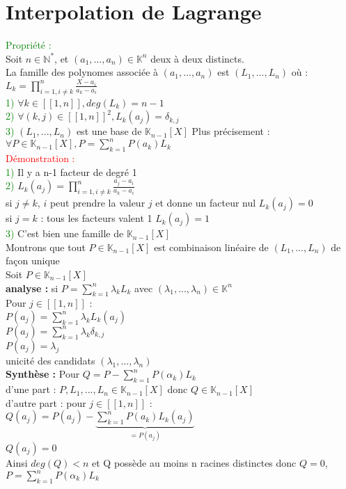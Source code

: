 \documentclass{article}
\begin{document}
\section{Interpolation de Lagrange}
\textcolor{green}{Propriété :} \\
Soit $n \in \mathbb N^*$, et $(a_1,...,a_n) \in \mathbb K^n$ deux à deux distincts. \\
La famille des polynomes associée à $(a_1,...,a_n)$ est $(L_1,...,L_n)$ où : \\
$L_k=\prod_{i=1,i \neq k}^n \frac{X-a_i}{a_k-a_i}$ \\
\textcolor{green}{1)} $\forall k \in [[1,n]], deg(L_k)=n-1$ \\
\textcolor{green}{2)} $\forall (k,j) \in [[1,n]]^2, L_k(a_j)=\delta_{k,j}$ \\
\textcolor{green}{3)} $(L_1,...,L_n)$ est une base de $\mathbb K_{n-1} [X] $ Plus précisement : \\
$\forall P \in \mathbb K_{n-1} [X], P= \sum_{k=1}^n P(a_k) L_k$ \\
\textcolor{red}{Démonstration :} \\
\textcolor{green}{1)} Il y a n-1 facteur de degré 1 \\
\textcolor{green}{2)} $L_k(a_j)=\prod_{i=1,i \neq k}^n \frac{a_j-a_i}{a_k-a_i}$ \\
si $j \neq k$, $i$ peut prendre la valeur $j$ et donne un facteur nul $L_k(a_j)=0$ \\
si $j=k$ : tous les facteurs valent 1 $L_k(a_j)=1$ \\
\textcolor{green}{3)} C'est bien une famille de $\mathbb K_{n-1} [X] $ \\
Montrons que tout $P \in \mathbb K_{n-1} [X]$ est combinaison linéaire de $(L_1,...,L_n)$ de façon unique \\
Soit $P \in \mathbb K_{n-1} [X]$ \\
{\bf analyse :} si $P= \sum_{k=1}^n \lambda_k L_k$ avec $(\lambda_1,...,\lambda_n) \in \mathbb K^n$ \\
Pour $j \in [[1,n]]$ : \\
$P(a_j)= \sum_{k=1}^n \lambda_k L_k(a_j) $ \\
$P(a_j)= \sum_{k=1}^n \lambda_k \delta_{k,j} $ \\
$P(a_j)= \lambda_j $ \\
unicité des candidats $(\lambda_1,..., \lambda_n)$ \\
{\bf Synthèse :} Pour $Q=P- \sum_{k=1}^n P(\alpha_k) L_k$ \\
d'une part : $P,L_1,...,L_n \in \mathbb K_{n-1} [X]$ donc $Q \in \mathbb K_{n-1} [X]$ \\
d'autre part : pour $j \in [[1,n ]]$ : \\
$Q(a_j)=P(a_j)-\underbrace{\sum_{k=1}^n P(a_k) L_k(a_j)}_{=P(a_j)}$ \\
$Q(a_j)=0$ \\
Ainsi $deg(Q)<n$ et Q possède au moins n racines distinctes donc $Q=0$, $P= \sum_{k=1}^n P(\alpha_k) L_k$ \\
\end{document}
